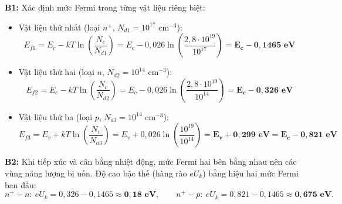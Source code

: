 \documentclass[11pt,a4paper]{article}
\renewcommand{\boldsymbol}[1]{\symbf{#1}}
\begin{document}
\textbf{B1:} Xác định mức Fermi trong từng vật liệu riêng biệt:
\begin{itemize}[leftmargin=*, topsep=1pt, itemsep=1pt]
  \item Vật liệu thứ nhất (loại $n^+$, $N_{d1} = 10^{17}\text{ cm}^{-3}$):
  \begin{equation*}
      E_{f1} = E_c - kT \ln\left(\frac{N_c}{N_{d1}}\right) = E_c - 0{,}026 \ln\left(\frac{2{,}8 \cdot 10^{19}}{10^{17}}\right) = \boldsymbol{E_c - 0{,}1465\text{ eV}}
  \end{equation*}
  \item Vật liệu thứ hai (loại $n$, $N_{d2} = 10^{14}\text{ cm}^{-3}$):
  \begin{equation*}
      E_{f2} = E_c - kT \ln\left(\frac{N_c}{N_{d2}}\right) = E_c - 0{,}026 \ln\left(\frac{2{,}8 \cdot 10^{19}}{10^{14}}\right) = \boldsymbol{E_c - 0{,}326\text{ eV}}
  \end{equation*}
  \item Vật liệu thứ ba (loại $p$, $N_{a3} = 10^{14}\text{ cm}^{-3}$):
  \begin{equation*}
      E_{f3} = E_v + kT \ln\left(\frac{N_v}{N_{a3}}\right) = E_v + 0{,}026 \ln\left(\frac{10^{19}}{10^{14}}\right) = \boldsymbol{E_v + 0{,}299\text{ eV}} = \boldsymbol{E_c - 0{,}821\text{ eV}}
  \end{equation*}
\end{itemize}

\textbf{B2:} Khi tiếp xúc và cân bằng nhiệt động, mức Fermi hai bên bằng nhau nên các vùng năng lượng bị uốn.
Độ cao bậc thế (hàng rào $eU_k$) bằng hiệu hai mức Fermi ban đầu:
\begin{equation*}
    n^+\!-n:\ eU_k=0{,}326-0{,}1465\approx\boldsymbol{0{,}18\text{ eV}},\qquad
    n^+\!-p:\ eU_k=0{,}821-0{,}1465\approx\boldsymbol{0{,}675\text{ eV}}.
\end{equation*}
\end{document}

